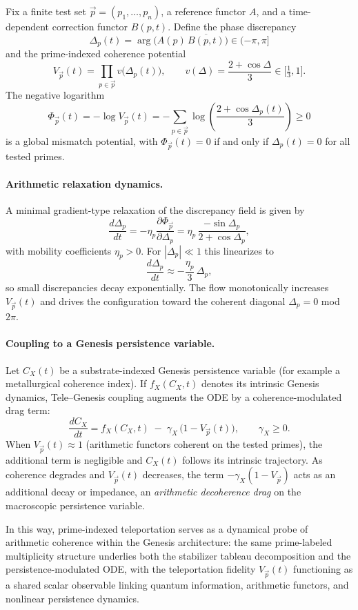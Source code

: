 \documentclass[11pt]{article}
\begin{document}
Fix a finite test set $\vec p=(p_1,\dots,p_n)$, a reference functor $A$, and a time-dependent correction functor $B(p,t)$. Define the phase discrepancy
\[
\Delta_p(t) = \arg\bigl(A(p)\,\overline{B(p,t)}\bigr) \in (-\pi,\pi]
\]
and the prime-indexed coherence potential
\[
V_{\vec p}(t)
= \prod_{p\in\vec p} v\bigl(\Delta_p(t)\bigr),
\qquad
v(\Delta) = \frac{2+\cos\Delta}{3} \in \bigl[\tfrac13,1\bigr].
\]
The negative logarithm
\[
\Phi_{\vec p}(t) = -\log V_{\vec p}(t)
= -\sum_{p\in\vec p} \log\!\left(\frac{2+\cos\Delta_p(t)}{3}\right) \ge 0
\]
is a global mismatch potential, with $\Phi_{\vec p}(t)=0$ if and only if $\Delta_p(t)=0$ for all tested primes.

\paragraph{Arithmetic relaxation dynamics.}

A minimal gradient-type relaxation of the discrepancy field is given by
\[
\frac{d\Delta_p}{dt}
= -\eta_p \frac{\partial \Phi_{\vec p}}{\partial \Delta_p}
= \eta_p\,\frac{-\sin\Delta_p}{2+\cos\Delta_p},
\]
with mobility coefficients $\eta_p>0$. For $|\Delta_p|\ll 1$ this linearizes to
\[
\frac{d\Delta_p}{dt} \approx -\frac{\eta_p}{3}\,\Delta_p,
\]
so small discrepancies decay exponentially. The flow monotonically increases $V_{\vec p}(t)$ and drives the configuration toward the coherent diagonal $\Delta_p=0$ mod $2\pi$.

\paragraph{Coupling to a Genesis persistence variable.}

Let $C_X(t)$ be a substrate-indexed Genesis persistence variable (for example a metallurgical coherence index). If $f_X(C_X,t)$ denotes its intrinsic Genesis dynamics, Tele--Genesis coupling augments the ODE by a coherence-modulated drag term:
\[
\frac{dC_X}{dt}
= f_X(C_X,t) \;-\; \gamma_X\,\bigl(1 - V_{\vec p}(t)\bigr),
\qquad \gamma_X \ge 0.
\]
When $V_{\vec p}(t)\approx 1$ (arithmetic functors coherent on the tested primes), the additional term is negligible and $C_X(t)$ follows its intrinsic trajectory. As coherence degrades and $V_{\vec p}(t)$ decreases, the term $-\gamma_X(1-V_{\vec p})$ acts as an additional decay or impedance, an \emph{arithmetic decoherence drag} on the macroscopic persistence variable.

In this way, prime-indexed teleportation serves as a dynamical probe of arithmetic coherence within the Genesis architecture: the same prime-labeled multiplicity structure underlies both the stabilizer tableau decomposition and the persistence-modulated ODE, with the teleportation fidelity $V_{\vec p}(t)$ functioning as a shared scalar observable linking quantum information, arithmetic functors, and nonlinear persistence dynamics.
\end{document}
